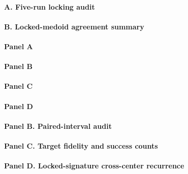 

\paragraph*{A. Five-run locking audit}



\paragraph*{B. Locked-medoid agreement summary}



\paragraph*{Panel A}



\paragraph*{Panel B}



\paragraph*{Panel C}



\paragraph*{Panel D}





\paragraph*{Panel B. Paired-interval audit}



\paragraph*{Panel C. Target fidelity and success counts}



\paragraph*{Panel D. Locked-signature cross-center recurrence}

